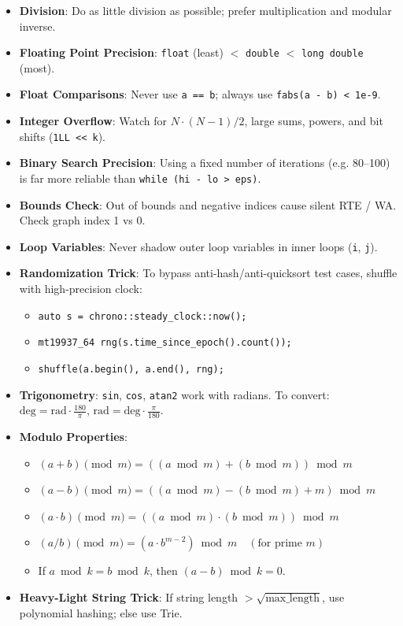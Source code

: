 \begin{itemize}
    \item \textbf{Division}: Do as little division as possible; prefer multiplication and modular inverse.
    \item \textbf{Floating Point Precision}: \texttt{float} (least) $<$ \texttt{double} $<$ \texttt{long double} (most).
    \item \textbf{Float Comparisons}: Never use \texttt{a == b}; always use \texttt{fabs(a - b) < 1e-9}.
    \item \textbf{Integer Overflow}: Watch for $N \cdot (N - 1) / 2$, large sums, powers, and bit shifts (\texttt{1LL << k}).
    \item \textbf{Binary Search Precision}: Using a fixed number of iterations (e.g. 80--100) is far more reliable than \texttt{while (hi - lo > eps)}.
    \item \textbf{Bounds Check}: Out of bounds and negative indices cause silent RTE / WA. Check graph index 1 vs 0.
    \item \textbf{Loop Variables}: Never shadow outer loop variables in inner loops (\texttt{i}, \texttt{j}).
    \item \textbf{Randomization Trick}: To bypass anti-hash/anti-quicksort test cases, shuffle with high-precision clock:
    \begin{itemize}
        \item \texttt{auto s = chrono::steady\_clock::now();}
        \item \texttt{mt19937\_64 rng(s.time\_since\_epoch().count());}
        \item \texttt{shuffle(a.begin(), a.end(), rng);}
    \end{itemize}
    \item \textbf{Trigonometry}: \texttt{sin}, \texttt{cos}, \texttt{atan2} work with radians. To convert: $\text{deg} = \text{rad} \cdot \frac{180}{\pi}$, $\text{rad} = \text{deg} \cdot \frac{\pi}{180}$.
    \item \textbf{Modulo Properties}:
    \begin{itemize}
        \item $(a + b) \pmod m = ((a \bmod m) + (b \bmod m)) \bmod m$
        \item $(a - b) \pmod m = ((a \bmod m) - (b \bmod m) + m) \bmod m$
        \item $(a \cdot b) \pmod m = ((a \bmod m) \cdot (b \bmod m)) \bmod m$
        \item $(a / b) \pmod m = (a \cdot b^{m - 2}) \bmod m \quad (\text{for prime } m)$
        \item If $a \bmod k = b \bmod k$, then $(a - b) \bmod k = 0$.
    \end{itemize}
    \item \textbf{Heavy-Light String Trick}: If string length $> \sqrt{\text{max\_length}}$, use polynomial hashing; else use Trie.
\end{itemize}
